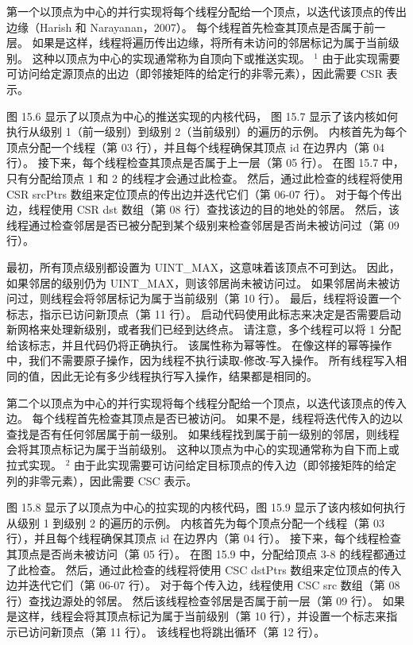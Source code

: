 第一个以顶点为中心的并行实现将每个线程分配给一个顶点，以迭代该顶点的传出边缘（Harish 和 Narayanan，2007）。 
每个线程首先检查其顶点是否属于前一层。 如果是这样，线程将遍历传出边缘，将所有未访问的邻居标记为属于当前级别。 
这种以顶点为中心的实现通常称为自顶向下或推送实现。 
${ }^{1}$ 由于此实现需要可访问给定源顶点的出边（即邻接矩阵的给定行的非零元素），因此需要 CSR 表示。

图 15.6 显示了以顶点为中心的推送实现的内核代码，
图 15.7 显示了该内核如何执行从级别 1（前一级别）到级别 2（当前级别）的遍历的示例。 
内核首先为每个顶点分配一个线程（第 03 行），并且每个线程确保其顶点 id 在边界内（第 04 行）。 
接下来，每个线程检查其顶点是否属于上一层（第 05 行）。 在图 15.7 中，只有分配给顶点 1 和 2 的线程才会通过此检查。 
然后，通过此检查的线程将使用 CSR srcPtrs 数组来定位顶点的传出边并迭代它们（第 06-07 行）。 
对于每个传出边，线程使用 CSR dst 数组（第 08 行）查找该边的目的地处的邻居。 
然后，该线程通过检查邻居是否已被分配到某个级别来检查邻居是否尚未被访问过（第 09 行）。

最初，所有顶点级别都设置为 UINT\_MAX，这意味着该顶点不可到达。 
因此，如果邻居的级别仍为 UINT\_MAX，则该邻居尚未被访问过。 
如果邻居尚未被访问过，则线程会将邻居标记为属于当前级别（第 10 行）。 
最后，线程将设置一个标志，指示已访问新顶点（第 11 行）。 
启动代码使用此标志来决定是否需要启动新网格来处理新级别，或者我们已经到达终点。 
请注意，多个线程可以将 1 分配给该标志，并且代码仍将正确执行。 该属性称为幂等性。 
在像这样的幂等操作中，我们不需要原子操作，因为线程不执行读取-修改-写入操作。 
所有线程写入相同的值，因此无论有多少线程执行写入操作，结果都是相同的。

第二个以顶点为中心的并行实现将每个线程分配给一个顶点，以迭代该顶点的传入边。 每个线程首先检查其顶点是否已被访问。 
如果不是，线程将迭代传入的边以查找是否有任何邻居属于前一级别。 
如果线程找到属于前一级别的邻居，则线程会将其顶点标记为属于当前级别。 
这种以顶点为中心的实现通常称为自下而上或拉式实现。 
${ }^{2}$ 由于此实现需要可访问给定目标顶点的传入边（即邻接矩阵的给定列的非零元素），因此需要 CSC 表示。

图 15.8 显示了以顶点为中心的拉实现的内核代码，图 15.9 显示了该内核如何执行从级别 1 到级别 2 的遍历的示例。 
内核首先为每个顶点分配一个线程（第 03 行），并且每个线程确保其顶点 id 在边界内（第 04 行）。 
接下来，每个线程检查其顶点是否尚未被访问（第 05 行）。 在图 15.9 中，分配给顶点 3-8 的线程都通过了此检查。 
然后，通过此检查的线程将使用 CSC dstPtrs 数组来定位顶点的传入边并迭代它们（第 06-07 行）。 
对于每个传入边，线程使用 CSC src 数组（第 08 行）查找边源处的邻居。 然后该线程检查邻居是否属于前一层（第 09 行）。 
如果是这样，线程会将其顶点标记为属于当前级别（第 10 行），并设置一个标志来指示已访问新顶点（第 11 行）。 
该线程也将跳出循环（第 12 行）。

